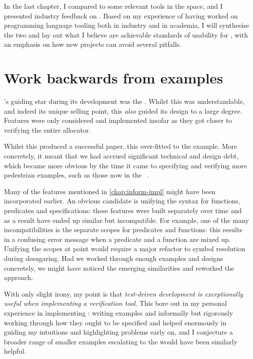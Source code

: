 \margintoc{}

In the last chapter, I compared  to some relevant tools in the
space, and I presented industry feedback on .
Based on my experience of having worked on programming language tooling both in
industry and in academia, I will synthesise the two and lay out what I believe
are achievable standards of usability for , with an emphasis on how new
projects can avoid several pitfalls.

\section{Work backwards from examples}

's guiding star during its development was the . Whilst this was understandable, and indeed its unique selling
point, this \emph{also} guided its design to a large degree. Features were only
considered and implemented insofar as they got  closer to verifying the
entire allocator.

Whilst this produced a successful paper, this over-fitted  to the example.
More concretely, it meant that we had accrued significant technical and design
debt, which became more obvious by the time it came to specifying and verifying
more pedestrian examples, such as those now in the ~.

Many of the features mentioned in \cref{chap:inform-impl} might have been
incorporated earlier. An obvious candidate is unifying the syntax for
functions, predicates and specifications: these features were built separately
over time and as a result have ended up similar but
incompatible. For example, one of the many incompatibilities is the separate scopes
for predicates and functions: this results in a confusing error message when
a predicate and a function are mixed up. Unifying the scopes at
point would require a major refactor to symbol resolution during
desugaring. Had we worked through enough examples and designs concretely, we might
have noticed the emerging similarities and reworked the approach.

With only slight irony, my point is that \emph{test-driven development is
exceptionally useful when implementing a verification tool}. This bore out in
my personal experience in implementing : writing examples and
informally but rigorously working through how they ought to be specified and
helped enormously in guiding my intuitions and highlighting problems early on,
and I conjecture a broader range of smaller examples escalating to the
 would have been similarly helpful.

